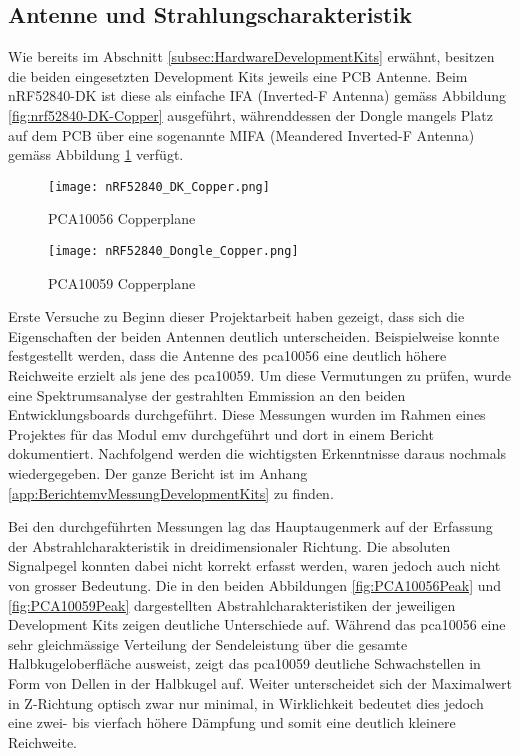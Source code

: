  
\subsection{Antenne und Strahlungscharakteristik}\label{subsec:AntenneundStrahlungscharakteristik}

Wie bereits im Abschnitt \ref{subsec:HardwareDevelopmentKits} erwähnt, besitzen die beiden eingesetzten Development Kits jeweils eine PCB Antenne. Beim nRF52840-DK ist diese als einfache IFA (Inverted-F Antenna) gemäss Abbildung \ref{fig:nrf52840-DK-Copper} ausgeführt, währenddessen der Dongle mangels Platz auf dem PCB über eine sogenannte MIFA (Meandered Inverted-F Antenna) gemäss Abbildung \ref{fig:nrf52840-Dongle-Copper} verfügt.

\begin{figure}[!htbp]
\centering
\begin{minipage}[b]{0.49\textwidth}
		\centering
		\texttt{[image: nRF52840\_DK\_Copper.png]}
		\caption[PCA10056 Copperplane mit IFA-Antenne]{PCA10056 Copperplane \cite{nordic_semiconductor_asa_pca10056_schematic_and_pcb_2019}}
		\label{fig:nrf52840-DK-Copper}
\end{minipage}
\begin{minipage}[b]{0.49\textwidth}
		\centering
		\texttt{[image: nRF52840\_Dongle\_Copper.png]}
		\caption[PCA10059 Copperplane mit MIFA-Antenne]{PCA10059 Copperplane \cite{nordic_semiconductor_asa_pca10059_schematic_and_pcb_2020}}
		\label{fig:nrf52840-Dongle-Copper}
\end{minipage}
\end{figure}

Erste Versuche zu Beginn dieser Projektarbeit haben gezeigt, dass sich die Eigenschaften der beiden Antennen deutlich unterscheiden. Beispielweise konnte festgestellt werden, dass die Antenne des pca10056 eine deutlich höhere Reichweite erzielt als jene des pca10059.
Um diese Vermutungen zu prüfen, wurde eine Spektrumsanalyse der gestrahlten Emmission an den beiden Entwicklungsboards durchgeführt. Diese Messungen wurden im Rahmen eines Projektes für das Modul emv durchgeführt und dort in einem Bericht dokumentiert. Nachfolgend werden die wichtigsten Erkenntnisse daraus nochmals wiedergegeben. Der ganze Bericht ist im Anhang \ref{app:BerichtemvMessungDevelopmentKits} zu finden.

Bei den durchgeführten Messungen lag das Hauptaugenmerk auf der Erfassung der Abstrahlcharakteristik in dreidimensionaler Richtung. Die absoluten Signalpegel konnten dabei nicht korrekt erfasst werden, waren jedoch auch nicht von grosser Bedeutung.
Die in den beiden Abbildungen \ref{fig:PCA10056Peak} und \ref{fig:PCA10059Peak} dargestellten Abstrahlcharakteristiken der jeweiligen Development Kits zeigen deutliche Unterschiede auf. Während das pca10056 eine sehr gleichmässige Verteilung der Sendeleistung über die gesamte Halbkugeloberfläche ausweist, zeigt das pca10059 deutliche Schwachstellen in Form von Dellen in der Halbkugel auf.
Weiter unterscheidet sich der Maximalwert in Z-Richtung optisch zwar nur minimal, in Wirklichkeit bedeutet dies jedoch eine zwei- bis vierfach höhere Dämpfung und somit eine deutlich kleinere Reichweite.

